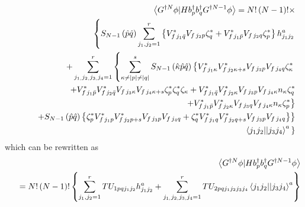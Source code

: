 \documentclass[aps,preprint]{revtex4}
\begin{document}
\begin{eqnarray}
&&\left\langle G^{\dagger N}\phi |Hb_{p}^{\dagger }b_{q}^{\dagger
}G^{\dagger N-1}\phi \right\rangle =N!\left( N-1\right) !\times   \notag \\
&&\left\{ S_{N-1}\left( \hat{p}\hat{q}\right)
\sum_{j_{1},j_{2}=1}^{r}\left\{ V_{f\,j_{1}\bar{q}}^{\ast
}V_{f\,j_{2}p}\zeta _{q}^{\ast }+V_{f\,j_{1}\bar{p}}^{\ast
}V_{f\,j_{2}q}\zeta _{p}^{\ast }\right\} h_{j_{1}j_{2}}^{a}\right.   \notag
\\
&&+\sum_{j_{1,}j_{2,}j_{3,}j_{4}=1}^{r}\left\{ \sum_{\kappa \neq \left|
p\right| \neq \left| q\right| }^{s}S_{N-1}\left( \hat{\kappa}\hat{p}\hat{q}%
\right) \left\{ V_{f\,j_{1}\kappa }^{\ast }V_{f\,j_{2}\kappa +s}^{\ast
}V_{f\,j_{3}p}V_{f\,j_{4}q}\zeta _{\kappa }^{\ast }\right. \right.   \notag
\\
&&\quad \qquad \quad +V_{f\,j_{1}\bar{p}}^{\ast }V_{f\,j_{2}\bar{q}}^{\ast
}V_{f\,j_{3}\kappa }V_{f\,j_{4}\kappa +s}\zeta _{p}^{\ast }\zeta _{q}^{\ast
}\zeta _{\kappa }+V_{f\,j_{1}\bar{q}}^{\ast }V_{f\,j_{2}\kappa }^{\ast
}V_{f\,j_{3}p}V_{f\,j_{4}\kappa }n_{\kappa }\zeta _{q}^{\ast }  \notag \\
&&\qquad \qquad \qquad \qquad \qquad \qquad \qquad \qquad \qquad \qquad
\left. +V_{f\,j_{1}\bar{p}}^{\ast }V_{f\,j_{2}\kappa }^{\ast
}V_{f\,j_{3}q}V_{f\,j_{4}\kappa }n_{\kappa }\zeta _{p}^{\ast }\right\}  
\notag \\
&&\left. +S_{N-1}\left( \hat{p}\hat{q}\right) \left\{ \zeta _{p}^{\ast
}V_{f\,j_{1}p}^{\ast }V_{f\,j_{2}p+s}^{\ast
}V_{f\,j_{3}p}V_{f\,j_{4}q}+\zeta _{q}^{\ast }V_{f\,j_{1}q}^{\ast
}V_{f\,j_{2}q+s}^{\ast }V_{f\,j_{3}p}V_{f\,j_{4}q}\right\} \right\}   \notag
\\
&&\qquad \qquad \qquad \qquad \qquad \qquad \qquad \qquad \qquad \qquad
\qquad \qquad \left. \left\langle j_{1}j_{2}||j_{3}j_{4}\right\rangle ^{a}%
\begin{array}{c}
\end{array}%
\right\} 
\end{eqnarray}%
which can be rewritten as 
\begin{eqnarray}
&&\left\langle G^{\dagger N}\phi |Hb_{p}^{\dagger }b_{q}^{\dagger
}G^{\dagger N-1}\phi \right\rangle   \notag \\
&&\left. {}\right. =N!\left( N-1\right) !\left\{
\sum_{j_{1},j_{2}=1}^{r}TU_{1pqj_{1}j_{2}}h_{j_{1}j_{2}}^{a}+%
\sum_{j_{1,}j_{2,}j_{3,}j_{4}=1}^{r}TU_{2pqj_{1}j_{2}j_{3}j_{4}}\left\langle
j_{1}j_{2}||j_{3}j_{4}\right\rangle ^{a}\right\} 
\end{eqnarray}%
\end{document}
